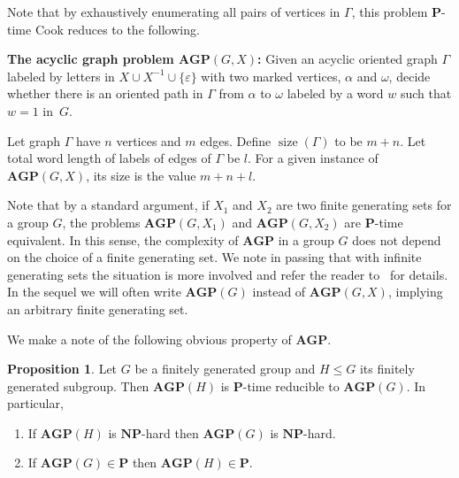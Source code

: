 \documentclass[10pt]{amsart}
\theoremstyle{definition}
\newtheorem{proposition}[theorem]{Proposition}
\DeclareMathOperator{\size}{{size}}
\def\P{{\mathbf{P}}}
\def\NP{{\mathbf{NP}}}
\def\AGP{{\mathbf{AGP}}}
\begin{document}
\medskip
Note that by exhaustively enumerating all pairs of vertices in $\Gamma$, this problem $\P$-time Cook reduces to the following.

\medskip
\noindent
{\bf The acyclic graph problem $\AGP(G,X)$\index{$\AGP(G,X)$}:}
Given an acyclic oriented graph $\Gamma$ labeled by letters in $X\cup X^{-1}\cup \{\varepsilon\}$ with two marked vertices, $\alpha$ and $\omega$, decide whether there is an oriented path in $\Gamma$ from $\alpha$ to $\omega$ labeled by a word $w$ such that $w=1$ in~$G$.

\medskip
Let graph $\Gamma$ have $n$ vertices and $m$ edges. Define $\size(\Gamma)$ to be $m+n$. Let total word length of labels of edges of $\Gamma$ be $l$. For a given instance of $\AGP(G,X)$, its size is the value $m+n+l$.

Note that by a standard argument, if $X_1$ and $X_2$ are two finite generating sets for a group $G$, the problems $\AGP(G,X_1)$ and $\AGP(G,X_2)$ are $\P$-time equivalent. In this sense, the complexity  of $\AGP$ in a group $G$ does not depend on the choice of a finite generating set. We note in passing that with infinite generating sets the situation is more involved and refer the reader to~\cite{MNU1} for details. In the sequel we will often write $\AGP(G)$ instead of $\AGP(G,X)$, implying an arbitrary finite generating set.

We make a note of the following obvious property of $\AGP$.
\begin{proposition}\label{pr:subgroup}
Let $G$ be a finitely generated group and $H\le G$ its finitely generated subgroup. Then $\AGP(H)$ is $\P$-time reducible to $\AGP(G)$. In particular,
\begin{enumerate}
\item If $\AGP(H)$ is $\NP$-hard then $\AGP(G)$ is $\NP$-hard.
\item If $\AGP(G)\in \P$ then $\AGP(H)\in \P$.
\end{enumerate}
\end{proposition}
 
\end{document}
